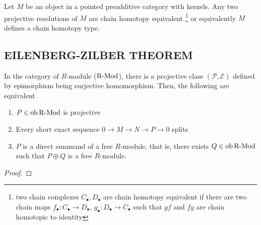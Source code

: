\documentclass{article}
\begin{document}
\begin{corollary}
    Let $M$ be an object in a pointed preadditive category with kernels. Any two projective resolutions of $M$ are chain homotopy equivalent \footnote{two chain complexes $C_\bullet, D_\bullet$ are chain homotopy equivalent if there are two chain maps $f_\bullet: C_\bullet \to D_\bullet$, $g_\bullet: D_\bullet \to C_\bullet$ such that $gf$ and $fg$ are chain homotopic to identity} or equivalently $M$ defines a chain homotopy type.
\end{corollary}

\begin{definition}
\end{definition}



\subsection{EILENBERG-ZILBER THEOREM}


\begin{proposition}
    In the category of $R$-module ($\operatorname{R-Mod}$), there is a projective class $(\mathcal{P}, \mathcal{E})$ defined by epimorphism being surjective homomorphism. Then, the following are equivalent
    \begin{enumerate}
        \item $P \in \operatorname{ob} \operatorname{R-Mod}$ is projective
        \item Every short exact sequence $0 \to M \to N \to P \to 0$ splits
        \item $P$ is a direct summand of a free $R$-module, that is, there exists $Q \in \operatorname{ob} \operatorname{R-Mod}$ such that $P \oplus Q$ is a free $R$-module.
    \end{enumerate}    
\end{proposition}

\begin{proof}
\end{proof}
\end{document}
